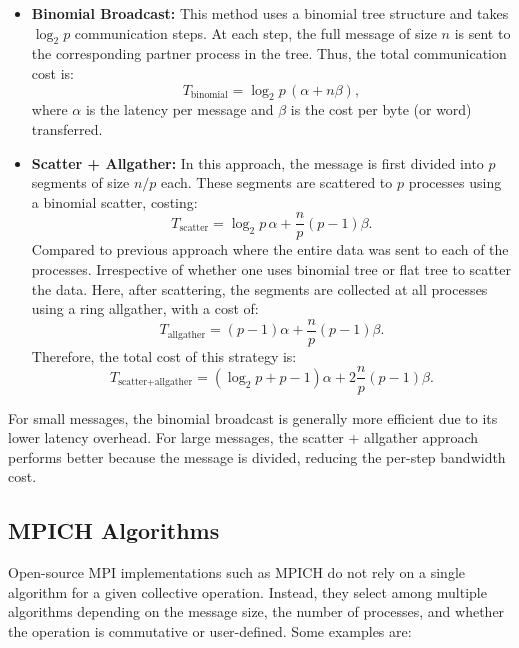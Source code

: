 \documentclass[12pt]{book}
\begin{document}
\begin{itemize}
    \item \textbf{Binomial Broadcast:}  
    This method uses a binomial tree structure and takes $\log_2 p$ communication steps.  
    At each step, the full message of size $n$ is sent to the corresponding partner process in the tree.  
    Thus, the total communication cost is:
    \[
    T_\text{binomial} = \log_2 p \, (\alpha + n\beta),
    \]
    where $\alpha$ is the latency per message and $\beta$ is the cost per byte (or word) transferred.

    \item \textbf{Scatter + Allgather:}  
    In this approach, the message is first divided into $p$ segments of size $n/p$ each.  
    These segments are scattered to $p$ processes using a binomial scatter, costing:
    \[
    T_\text{scatter} = \log_2 p \, \alpha + \frac{n}{p}(p-1)\beta.
    \]
    Compared to previous approach where the entire data was sent to each of the processes. Irrespective of whether one uses binomial tree or flat tree to scatter the data. Here, after scattering, the segments are collected at all processes using a ring allgather, with a cost of:
    \[
    T_\text{allgather} = (p-1)\alpha + \frac{n}{p}(p-1)\beta.
    \]
    Therefore, the total cost of this strategy is:
    \[
    T_\text{scatter+allgather} = (\log_2 p + p - 1)\alpha + 2\frac{n}{p}(p-1)\beta.
    \]

\end{itemize}

For small messages, the binomial broadcast is generally more efficient due to its lower latency overhead.  
For large messages, the scatter + allgather approach performs better because the message is divided, reducing the per-step bandwidth cost.

\subsection{MPICH Algorithms}
Open-source MPI implementations such as MPICH do not rely on a single algorithm for a given collective operation. Instead, they select among multiple algorithms depending on the message size, the number of processes, and whether the operation is commutative or user-defined. Some examples are:
\end{document}
